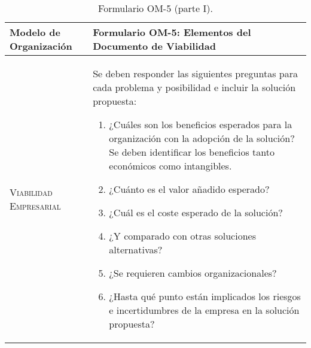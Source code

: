 \documentclass[12pt,a4paper,twoside,spanish]{article}      %
\begin{document}
\begin{table}[H]
\scriptsize
\begin{tabularx}{\textwidth}{|l|X|} \hline


\textbf{Modelo de Organización} & \textbf{Formulario OM-5: Elementos del Documento de Viabilidad}\\ \hline\hline
\textsc{Viabilidad Empresarial} & Se deben responder las siguientes preguntas para cada problema y posibilidad e incluir la solución propuesta:
\begin{enumerate}
    \item¿Cuáles son los beneficios esperados para la organización con la adopción de la
solución? Se deben identificar los beneficios tanto económicos como intangibles.
    \item¿Cuánto es el valor añadido esperado?
    \item¿Cuál es el coste esperado de la solución? 
    \item¿Y comparado con otras soluciones alternativas?
    \item¿Se requieren cambios organizacionales?
    \item¿Hasta qué punto están implicados los riesgos e incertidumbres de la empresa
en la solución propuesta?
\end{enumerate}
\\ \hline
\end{tabularx}
\caption{Formulario OM-5 (parte I).}
  \label{tab.OM5_1}
\end{table}
\end{document}
